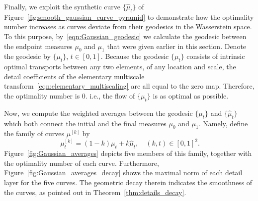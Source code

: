 \documentclass[12pt]{amsart}
\begin{document}
Finally, we exploit the synthetic curve $\{\widehat{\mu}_t\}$ of Figure~\ref{fig:smooth_gaussian_curve_pyramid} to demonstrate how the optimality number increases as curves deviate from their geodesics in the Wasserstein space. To this purpose, by~\eqref{eqn:Gaussian_geodesic} we calculate the geodesic between the endpoint measures $\mu_0$ and $\mu_1$ that were given earlier in this section. Denote the geodesic by $\{\mu_t\}$, $t\in[0,1]$. Because the geodesic $\{\mu_t\}$ consists of intrinsic optimal transports between any two elements, of any location and scale, the detail coefficients of the elementary multiscale transform~\eqref{eqn:elementary_multiscaling} are all equal to the zero map. Therefore, the optimality number is $0$. i.e., the flow of $\{\mu_t\}$ is as optimal as possible.

Now, we compute the weighted averages between the geodesic $\{\mu_t\}$ and $\{\widehat{\mu}_t\}$ which both connect the initial and the final measures $\mu_0$ and $\mu_1$. Namely, define the family of curves $\mu^{[k]}$ by
\begin{equation}~\label{eqn:Gaussian_weighted_family}
    \mu^{[k]}_t = (1-k)\mu_t+k\widehat{\mu}_t, \quad (k, t)\in[0, 1]^2.
\end{equation}
Figure~\ref{fig:Gaussian_averages} depicts five members of this family, together with the optimality number of each curve. Furthermore, Figure~\ref{fig:Gaussian_averages_decay} shows the maximal norm of each detail layer for the five curves. The geometric decay therein indicates the smoothness of the curves, as pointed out in Theorem~\ref{thm:details_decay}.
\end{document}
